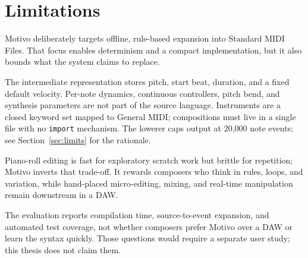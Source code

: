 \section{Limitations}\label{sec:limitations}

Motivo deliberately targets offline, rule-based expansion into Standard MIDI Files.
That focus enables determinism and a compact implementation, but it also bounds what the system claims to replace.

The intermediate representation stores pitch, start beat, duration, and a fixed default velocity.
Per-note dynamics, continuous controllers, pitch bend, and synthesis parameters are not part of the source language.
Instruments are a closed keyword set mapped to General MIDI; compositions must live in a single file with no
\texttt{import} mechanism.
The lowerer caps output at 20,000 note events; see Section~\ref{sec:limits} for the rationale.

Piano-roll editing is fast for exploratory scratch work but brittle for repetition; Motivo inverts that trade-off.
It rewards composers who think in rules, loops, and variation, while hand-placed micro-editing, mixing, and real-time
manipulation remain downstream in a DAW.

The evaluation reports compilation time, source-to-event expansion, and automated test coverage, not whether composers
prefer Motivo over a DAW or learn the syntax quickly.
Those questions would require a separate user study; this thesis does not claim them.
